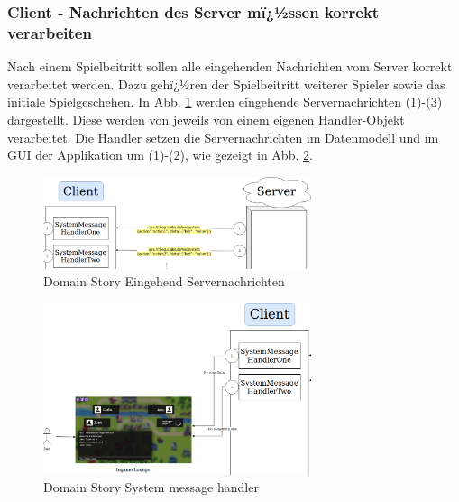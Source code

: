\documentclass[12pt, titlepage]{scrartcl}
\begin{document}
		\subsubsection{Client - Nachrichten des Server mï¿½ssen korrekt verarbeiten} Nach einem Spielbeitritt sollen alle eingehenden Nachrichten vom Server korrekt verarbeitet werden. Dazu gehï¿½ren der Spielbeitritt weiterer Spieler sowie das initiale Spielgeschehen. In Abb. \ref{DomainStoryHandler2} werden eingehende Servernachrichten (1)-(3) dargestellt. Diese werden von jeweils von einem eigenen Handler-Objekt verarbeitet. Die Handler setzen die Servernachrichten im Datenmodell und im GUI der Applikation um (1)-(2), wie gezeigt in Abb. \ref{DomainStoryHandler1}.
			\begin{figure}[H] 
				\centering
				\includegraphics[width=0.7\textwidth]{Handler2.png}
				\caption{Domain Story Eingehend Servernachrichten}
				\label{DomainStoryHandler2}
			\end{figure}
			\begin{figure}[H] 
				\centering
				\includegraphics[width=0.7\textwidth]{Handler1.png}
				\caption{Domain Story System message handler}
				\label{DomainStoryHandler1}
			\end{figure}
\end{document}
